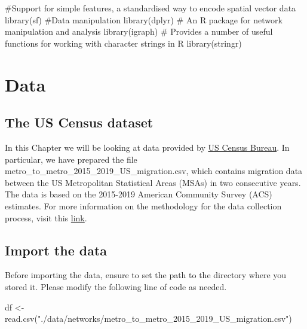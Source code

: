 \documentclass[
  letterpaper,
  DIV=11,
  numbers=noendperiod]{scrreprt}
\newenvironment{Shaded}{\begin{snugshade}}{\end{snugshade}}
\newcommand{\CommentTok}[1]{\textcolor[rgb]{0.37,0.37,0.37}{#1}}
\newcommand{\FunctionTok}[1]{\textcolor[rgb]{0.28,0.35,0.67}{#1}}
\newcommand{\NormalTok}[1]{\textcolor[rgb]{0.00,0.23,0.31}{#1}}
\newcommand{\OtherTok}[1]{\textcolor[rgb]{0.00,0.23,0.31}{#1}}
\newcommand{\StringTok}[1]{\textcolor[rgb]{0.13,0.47,0.30}{#1}}
\begin{document}
\begin{Shaded}
\begin{Highlighting}[]
\CommentTok{\#Support for simple features, a standardised way to encode spatial vector data}
\FunctionTok{library}\NormalTok{(sf)}
\CommentTok{\#Data manipulation}
\FunctionTok{library}\NormalTok{(dplyr)}
\CommentTok{\# An R package for network manipulation and analysis}
\FunctionTok{library}\NormalTok{(igraph)}
\CommentTok{\# Provides a number of useful functions for working with character strings in R}
\FunctionTok{library}\NormalTok{(stringr)}
\end{Highlighting}
\end{Shaded}

\hypertarget{sec-sec_data}{%
\section{Data}\label{sec-sec_data}}

\hypertarget{the-us-census-dataset}{%
\subsection{The US Census dataset}\label{the-us-census-dataset}}

In this Chapter we will be looking at data provided by
\href{https://www.census.gov/data/tables/2019/demo/geographic-mobility/metro-to-metro-migration.html}{US
Census Bureau}. In particular, we have prepared the file
metro\_to\_metro\_2015\_2019\_US\_migration.csv, which contains
migration data between the US Metropolitan Statistical Areas (MSAs) in
two consecutive years. The data is based on the 2015-2019 American
Community Survey (ACS) estimates. For more information on the
methodology for the data collection process, visit this
\href{https://www.census.gov/programs-surveys/acs/methodology.html}{link}.

\hypertarget{import-the-data-1}{%
\subsection{Import the data}\label{import-the-data-1}}

Before importing the data, ensure to set the path to the directory where
you stored it. Please modify the following line of code as needed.

\begin{Shaded}
\begin{Highlighting}[]
\NormalTok{df }\OtherTok{\textless{}{-}} \FunctionTok{read.csv}\NormalTok{(}\StringTok{"./data/networks/metro\_to\_metro\_2015\_2019\_US\_migration.csv"}\NormalTok{)}
\end{Highlighting}
\end{Shaded}
\end{document}
